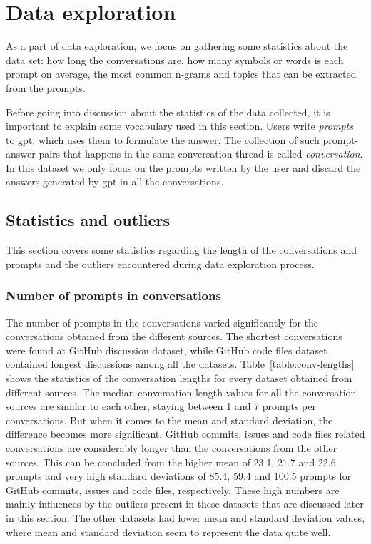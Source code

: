 \section{Data exploration}
As a part of data exploration, we focus on gathering some statistics about the data set: how long the conversations are, how many symbols or words is each prompt on average, the most common n-grams and topics that can be extracted from the prompts. 

Before going into discussion about the statistics of the data collected, it is important to explain some vocabulary used in this section. Users write \textit{prompts} to \gls{gpt}, which uses them to formulate the answer. The collection of such prompt-answer pairs that happens in the same conversation thread is called \textit{conversation}. In this dataset we only focus on the prompts written by the user and discard the answers generated by \gls{gpt} in all the conversations. 

\subsection{Statistics and outliers}
This section covers some statistics regarding the length of the conversations and prompts and the outliers encountered during data exploration process. 

\subsubsection{Number of prompts in conversations}
The number of prompts in the conversations varied significantly for the conversations obtained from the different sources. The shortest conversations were found at GitHub discussion dataset, while GitHub code files dataset contained longest discussions among all the datasets. Table~\ref{table:conv-lengths} shows the statistics of the conversation lengths for every dataset obtained from different sources. The median conversation length values for all the conversation sources are similar to each other, staying between 1 and 7 prompts per conversations. But when it comes to the mean and standard deviation, the difference becomes more significant. GitHub commits, issues and code files related conversations are considerably longer than the conversations from the other sources. This can be concluded from the higher mean of 23.1, 21.7 and 22.6 prompts and very high standard deviations of 85.4, 59.4 and 100.5 prompts for GitHub commits, issues and code files, respectively. These high numbers are mainly influences by the outliers present in these datasets that are discussed later in this section. The other datasets had lower mean and standard deviation values, where mean and standard deviation seem to represent the data quite well.

